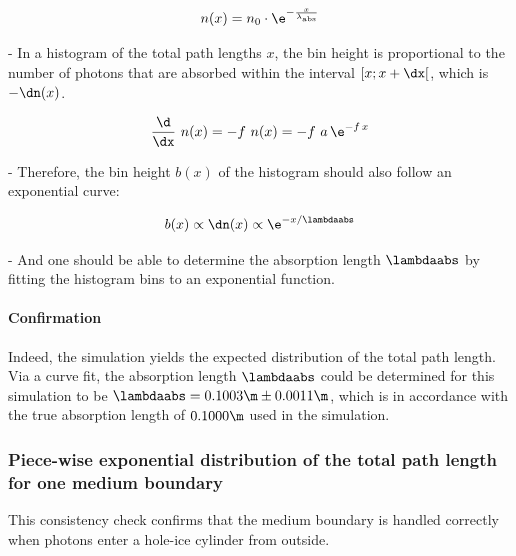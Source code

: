 $$
  n(x) = n_0 \cdot \e^{-\frac{x}{\lambda_\text{abs}}}
$$

%

- In a histogram of the total path lengths $x$, the bin height is proportional to the number of photons that are absorbed within the interval $[x; x + \dx[$, which is $-\dn(x)$.

$$ \frac{\d}{\dx}\ n(x) = -f\ n(x)
  = -f\ a\,\e^{-f\,x} $$

- Therefore, the bin height $b(x)$ of the histogram should also follow an exponential curve:

$$ b(x) \propto \dn(x) \propto \e^{-x/\lambdaabs} $$

- And one should be able to determine the absorption length $\lambdaabs$ by fitting the histogram bins to an exponential function.

\paragraph{Confirmation} Indeed, the simulation yields the expected distribution of the total path length. Via a curve fit, the absorption length $\lambdaabs$ could be determined for this simulation to be $\lambdaabs = 0.1003\m \pm 0.0011\m$, which is in accordance with the true absorption length of $0.1000\m$ used in the simulation.


\subsubsection{Piece-wise exponential distribution of the total path length for one medium boundary}


This consistency check confirms that the medium boundary is handled correctly when photons enter a hole-ice cylinder from outside.


%

